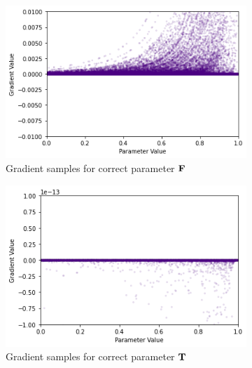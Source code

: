 \begin{figure}[h]
    \centering
    \begin{subfigure}[b]{0.47\textwidth}
        \centering
        \includegraphics[width=\textwidth]{imgs/grad_ss_10_falseparam_100dim.png}
        \caption{Gradient samples for correct parameter $\textbf{F}$}
        \label{fig:conjgrad10falsess100}
    \end{subfigure}
    \begin{subfigure}[b]{0.47\textwidth}
        \centering
        \includegraphics[width=\textwidth]{imgs/grad_ss_10_trueparam_100dim.png}
        \caption{Gradient samples for correct parameter $\textbf{T}$}
        \label{fig:conjgrad10truess100}
    \end{subfigure}
    \begin{subfigure}[b]{0.47\textwidth}
        \centering

\end{subfigure}
\end{figure}
